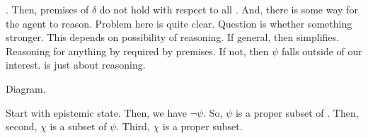 \hozline

\begin{note}[\prequ{}]
  \prequ{}.
  Then, premises of \(\delta\) do not hold with respect to all .
  And, there is some way for the agent to reason.
  Problem here is quite clear.
  Question is whether something stronger.
  This depends on possibility of reasoning.
  If general, then simplifies.
  Reasoning for anything by required by premises.
  If not, then \(\psi\) falls outside of our interest.
   is just about reasoning.
\end{note}

\begin{note}
  Diagram.

  Start with epistemic state.
  Then, we have \(\lnot\psi\).
  So, \(\psi\) is a proper subset of .
  Then, second, \(\chi\) is a subset of \(\psi\).
  Third, \(\chi\) is a proper subset.
\end{note}



